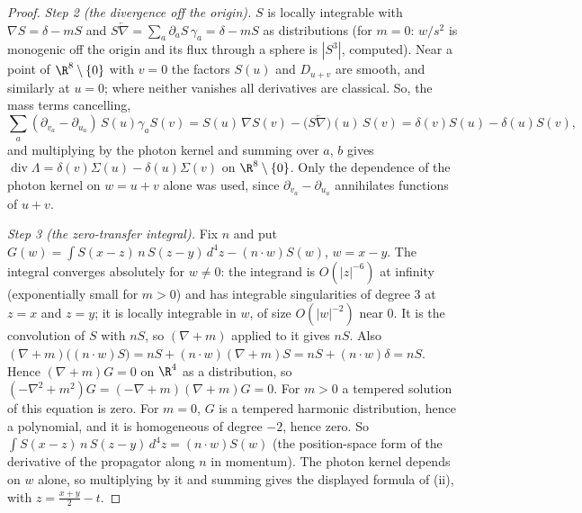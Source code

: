 \begin{proof}
\emph{Step 2 (the divergence off the origin).} $S$ is locally integrable with $\nabla S = \delta - mS$ and $S\overleftarrow{\nabla} = \sum_{a}\partial_{a}S\,\gamma_{a} = \delta - mS$ as distributions (for $m = 0$: $w/s^{2}$ is monogenic off the origin and its flux through a sphere is $|S^{3}|$, computed). Near a point of $\R^{8}\setminus\{0\}$ with $v = 0$ the factors $S(u)$ and $D_{u+v}$ are smooth, and similarly at $u = 0$; where neither vanishes all derivatives are classical. So, the mass terms cancelling,
\[
\sum_{a}(\partial_{v_{a}} - \partial_{u_{a}})\,S(u)\gamma_{a}S(v) = S(u)\,\nabla S(v) - \big(S\overleftarrow{\nabla}\big)(u)\,S(v) = \delta(v)S(u) - \delta(u)S(v),
\]
and multiplying by the photon kernel and summing over $a$, $b$ gives $\operatorname{div}\Lambda = \delta(v)\Sigma(u) - \delta(u)\Sigma(v)$ on $\R^{8}\setminus\{0\}$. Only the dependence of the photon kernel on $w = u + v$ alone was used, since $\partial_{v_{a}} - \partial_{u_{a}}$ annihilates functions of $u + v$.

\emph{Step 3 (the zero-transfer integral).} Fix $n$ and put $G(w) = \int S(x-z)\,n\,S(z-y)\,d^{4}z - (n\cdot w)S(w)$, $w = x - y$. The integral converges absolutely for $w \neq 0$: the integrand is $O(|z|^{-6})$ at infinity (exponentially small for $m > 0$) and has integrable singularities of degree $3$ at $z = x$ and $z = y$; it is locally integrable in $w$, of size $O(|w|^{-2})$ near $0$. It is the convolution of $S$ with $nS$, so $(\nabla + m)$ applied to it gives $nS$. Also $(\nabla + m)\big((n\cdot w)S\big) = nS + (n\cdot w)(\nabla + m)S = nS + (n\cdot w)\delta = nS$. Hence $(\nabla + m)G = 0$ on $\R^{4}$ as a distribution, so $(-\nabla^{2} + m^{2})G = (-\nabla + m)(\nabla + m)G = 0$. For $m > 0$ a tempered solution of this equation is zero. For $m = 0$, $G$ is a tempered harmonic distribution, hence a polynomial, and it is homogeneous of degree $-2$, hence zero. So $\int S(x-z)\,n\,S(z-y)\,d^{4}z = (n\cdot w)S(w)$ (the position-space form of the derivative of the propagator along $n$ in momentum). The photon kernel depends on $w$ alone, so multiplying by it and summing gives the displayed formula of (ii), with $z = \frac{x+y}{2} - t$.


\end{proof}
